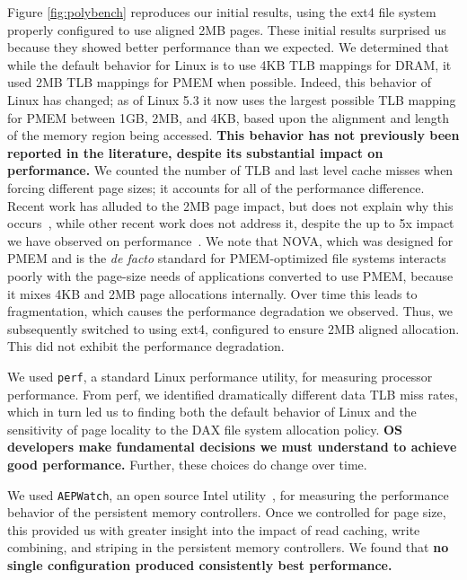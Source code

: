 Figure \ref{fig:polybench} reproduces our initial results, using the ext4 file system properly configured to use aligned 2MB pages.  These initial results surprised us because they showed better performance than we expected.  We determined that while the default behavior for Linux is to use 4KB TLB mappings for DRAM, it used 2MB TLB mappings for PMEM when possible. Indeed, this behavior of Linux has changed; as of Linux 5.3 it now uses the largest possible TLB mapping for PMEM between 1GB, 2MB, and 4KB, based upon the alignment and length of the memory region being accessed.  \textbf{This behavior has not previously been reported in the literature, despite its substantial impact on performance.}  We counted the number of TLB and last level cache misses when forcing different page sizes; it accounts for all of the performance difference. Recent work has alluded to the 2MB page impact, but does not explain why this occurs~\cite{kadekodi2019splitfs}, while other recent work does not address it, despite the up to 5x impact we have observed on performance~\cite{dong2019performance,peng2019system}. We note that NOVA, which was designed for PMEM and is the \textit{de facto} standard for PMEM-optimized file systems interacts poorly with the page-size needs of applications converted to use PMEM, because it mixes 4KB and 2MB page allocations internally.  Over time this leads to fragmentation, which causes the performance degradation we observed.  Thus, we subsequently switched to using ext4, configured to ensure 2MB aligned allocation.  This did not exhibit the performance degradation.

We used \texttt{perf}, a standard Linux performance utility, for measuring processor performance.  From perf, we identified dramatically different data TLB miss rates, which in turn led us to finding both the default behavior of Linux and the sensitivity of page locality to the DAX file system allocation policy.  \textbf{OS developers make fundamental decisions we must understand to achieve good performance.} Further, these choices do change over time.

We used \texttt{AEPWatch}, an open source Intel utility~\cite{IntelAEPWatch}, for measuring the performance behavior of the persistent memory controllers. Once we controlled for page size, this provided us with greater insight into the impact of read caching, write combining, and striping in the persistent memory controllers.  We found that \textbf{no single configuration produced consistently best performance.} 


